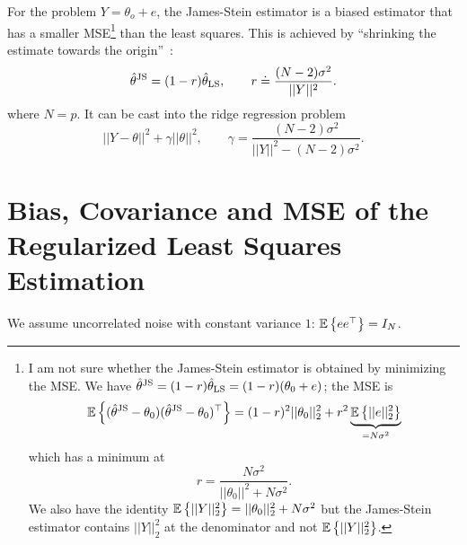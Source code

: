 For the problem $Y=\theta_o+e$, the James-Stein estimator is a biased estimator that has a smaller MSE\footnote{I am not sure whether the James-Stein estimator is obtained by minimizing the MSE. We have $\hat{\theta}^\textrm{JS} = (1-r)\hat{\theta}_\textrm{LS} = (1-r)(\theta_0+e)$; the MSE is
  \begin{align*}
    \mathbb{E}\left\{(\hat{\theta}^\textrm{JS}-\theta_0)(\hat{\theta}^\textrm{JS}-\theta_0)^\top\right\} = (1-r)^2||\theta_0||_2^2 + r^2\underbrace{\mathbb{E}\left\{||e||_2^2\right\}}_{=N\sigma^2}
  \end{align*}
  which has a minimum at
  \begin{equation*}
    r = \frac{N\sigma^2}{||\theta_0||^2+N\sigma^2}.
  \end{equation*}
  We also have the identity $\mathbb{E}\left\{||Y||_2^2\right\} = ||\theta_0||_2^2 + N\sigma^2$ but the James-Stein estimator contains $||Y||_2^2$ at the denominator and not $\mathbb{E}\left\{||Y||_2^2\right\}$.} than the least squares. This is achieved by ``shrinking the estimate towards the origin''~\cite[page~3]{pillonetto}:
\begin{equation*}
  \hat{\theta}^\textrm{JS} = (1-r)\hat{\theta}_\textrm{LS},\hspace{2em} r\doteq \frac{(N-2)\sigma^2}{||Y||^2}.
\end{equation*}
where $N=p$. It can be cast into the ridge regression problem
\begin{equation*}
  ||Y-\theta||^2 + \gamma ||\theta||^2,\hspace{2em} \gamma = \frac{(N-2)\sigma^2}{||Y||^2 - (N-2)\sigma^2}.
\end{equation*}

\section{Bias, Covariance and MSE of the Regularized Least Squares Estimation}
\label{sec:bias-covariance-MSE-regLS-estimation}

We assume uncorrelated noise with constant variance $1$: $\mathbb{E}\left\{e e^\top\right\} = I_N$.

